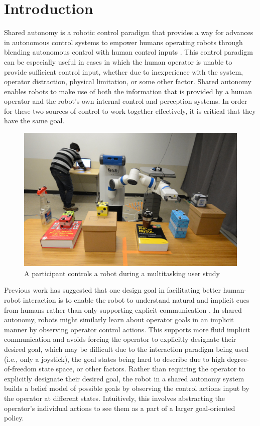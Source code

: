 \documentclass[conference]{IEEEtran}
\begin{document}
\section{Introduction}

Shared autonomy is a robotic control paradigm that provides a way for advances in autonomous control systems to empower humans operating robots through blending autonomous control with human control inputs \cite{dragan2012formalizing, dragan2013policy, gopinath2017human}. This control paradigm can be especially useful in cases in which the human operator is unable to provide sufficient control input, whether due to inexperience with the system, operator distraction, physical limitation, or some other factor. Shared autonomy enables robots to make use of both the information that is provided by a human operator and the robot's own internal control and perception systems. In order for these two sources of control to work together effectively, it is critical that they have the same goal.

\begin{figure}
\includegraphics[width=\columnwidth]{figures/teaser-v2.JPG}
\caption{A participant controls a robot during a multitasking user study}
\label{teaser}
\end{figure}

Previous work has suggested that one design goal in facilitating better human-robot interaction is to enable the robot to understand natural and implicit cues from humans rather than only supporting explicit communication \cite{goodrich2003seven}. In shared autonomy, robots might similarly learn about operator goals in an implicit manner by observing operator control actions. This supports more fluid implicit communication and avoids forcing the operator to explicitly designate their desired goal, which may be difficult due to the interaction paradigm being used (i.e., only a joystick), the goal states being hard to describe due to high degree-of-freedom state space, or other factors. Rather than requiring the operator to explicitly designate their desired goal, the robot in a shared autonomy system builds a belief model of possible goals by observing the control actions input by the operator at different states. Intuitively, this involves abstracting the operator's individual actions to see them as a part of a larger goal-oriented policy.
\end{document}
